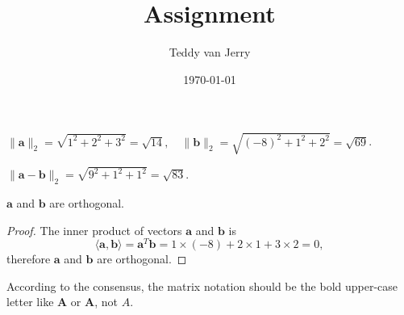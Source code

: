 \documentclass[oneside,solution]{seu-ml-assign}
\title{Assignment}
\author{Teddy van Jerry}
\date{\today}
\begin{document}
\maketitle


\subproblem{}
$\|\mathbf{a}\|_2=\sqrt{1^2+2^2+3^2}=\sqrt{14},\quad \|\mathbf{b}\|_2=\sqrt{(-8)^2+1^2+2^2}=\sqrt{69}$.

\subproblem{} 
$\|\mathbf{a}-\mathbf{b}\|_2=\sqrt{9^2+1^2+1^2}=\sqrt{83}$.

\subproblem{}
$\mathbf{a}$ and $\mathbf{b}$ are orthogonal.
\begin{proof}
The inner product of vectors $\mathbf{a}$ and $\mathbf{b}$ is
\begin{equation}
\langle\mathbf{a},\mathbf{b}\rangle=\mathbf{a}^T\mathbf{b}=1\times(-8)+2\times 1+3\times 2=0,
\end{equation}
therefore $\mathbf{a}$ and $\mathbf{b}$ are orthogonal.
\end{proof}

According to the consensus, the matrix notation should be the bold upper-case letter like $\mathbf{A}$ or $\bm{A}$, not $A$.
\end{document}
